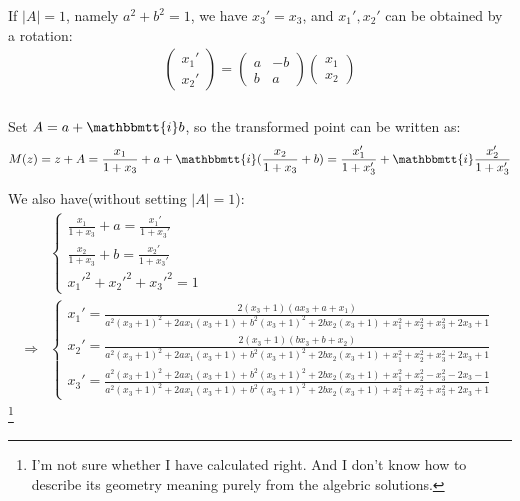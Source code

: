 \documentclass[]{ctexart}
\newcommand{\mi}{\mathbbmtt{i}}
\begin{document}
				If $|A|=1$, namely $a^2+b^2=1$, we have $x_3'=x_3$, and $x_1',x_2'$ can be obtained by a rotation:
					\begin{equation*}
					\begin{aligned}
						\begin{pmatrix}
							x_1'\\
							x_2'
						\end{pmatrix}
						=
						\begin{pmatrix}
						a & -b\\
						b & a
						\end{pmatrix}
						\begin{pmatrix}
						x_1\\
						x_2
						\end{pmatrix}
					\end{aligned}
					\end{equation*}
			
			\subsubsection{}
				Set $A=a+\mi b$, so the transformed point can be written as:
					\begin{equation*}
					\begin{aligned}
						M(z)=z+A=\frac{x_1}{1+x_3}+a+\mi (\frac{x_2}{1+x_3}+b)=\frac{x_1'}{1+x_3'}+\mi \frac{x_2'}{1+x_3'}
					\end{aligned}
					\end{equation*}
				
				We also have(without setting $|A|=1$):
					\begin{equation*}
					\begin{aligned}
						&\begin{cases}
							\frac{x_1}{1+x_3}+a=\frac{x_1'}{1+x_3'}\\
							\frac{x_2}{1+x_3}+b=\frac{x_2'}{1+x_3'}\\
							x_1'^2+x_2'^2+x_3'^2=1
						\end{cases}\\
						\Rightarrow 
						&\begin{cases}
							x_1'=\frac{2 (x_3+1) (a x_3+a+x_1)}{a^2 (x_3+1)^2+2 a x_1 (x_3+1)+b^2 (x_3+1)^2+2 b x_2 (x_3+1)+x_1^2+x_2^2+x_3^2+2 x_3+1}\\
							x_2'=\frac{2 (x_3+1) (b x_3+b+x_2)}{a^2 (x_3+1)^2+2 a x_1 (x_3+1)+b^2 (x_3+1)^2+2 b x_2 (x_3+1)+x_1^2+x_2^2+x_3^2+2 x_3+1}\\
							x_3'=\frac{a^2 (x_3+1)^2+2 a x_1 (x_3+1)+b^2 (x_3+1)^2+2 b x_2 (x_3+1)+x_1^2+x_2^2-x_3^2-2 x_3-1}{a^2 (x_3+1)^2+2 a x_1 (x_3+1)+b^2 (x_3+1)^2+2 b x_2 (x_3+1)+x_1^2+x_2^2+x_3^2+2 x_3+1}
						\end{cases}
					\end{aligned}
					\end{equation*}	\footnote{I'm not sure whether I have calculated right. And I don't know how to describe its geometry meaning purely from the algebric solutions. }
			
\end{document}
